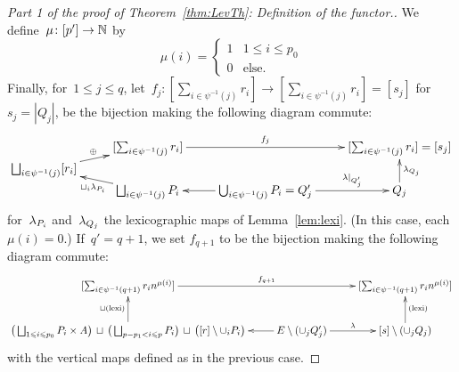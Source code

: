 \begin{proof}[Part 1 of the proof of Theorem~\ref{thm:LevTh}: Definition of the functor.]
We define~$\mu\colon[p']\to \mathbb{N}$ by 
$$\mu(i)=\left\{\begin{array}{ll} 1 & 1\le i\le p_0\\
0 & \textrm{else}. 
\end{array}\right.$$
Finally, for~$1\le j\le q$, let~$f_j\colon[\sum_{i\in \psi^{-1}(j)}r_i]\to [\sum_{i\in \psi^{-1}(j)}r_i]=[s_j]$ for $s_j=|Q_j|$, be the bijection making the following diagram commute: 
\begin{equation}\label{equ:Hmor}
\xymatrix@R-2pc{&[\sum_{i\in \psi^{-1}(j)}r_i]  \ar[rr]^-{f_j} && [\sum_{i\in \psi^{-1}(j)}r_i]=[s_j]\\
\bigsqcup_{i\in \psi^{-1}(j)}[r_i]\ar[ur]^-\oplus & &&  \\
&\bigsqcup_{i\in \psi^{-1}(j)}P_i  \ar[ul]^-{\sqcup_i\la_{P_i}} & \ar[l]\bigcup_{i\in \psi^{-1}(j)}P_i = Q'_j \ar[r]^-{\la|_{Q'_j}} & Q_j \ar[uu]_-{\la_{Q_j}} 
}\end{equation}
for~$\lambda_{P_i}$ and~$\lambda_{Q_j}$ the lexicographic maps of Lemma~\ref{lem:lexi}. (In this case, each $\mu(i)=0$.)  %
If~$q'=q+1$, we set $f_{q+1}$ 
to be the bijection making the following diagram commute: 
$$\xymatrix{[\sum_{i\in \psi^{-1}(q+1)}r_i n^{\mu(i)}]  \ar[rr]^-{f_{q+1}} && [\sum_{i\in \psi^{-1}(q+1)}r_i n^{\mu(i)}]\\
\big(\bigsqcup_{1\le i\le p_0}P_i\x A \big)\,\sqcup\,\big(\bigsqcup_{p-p_1< i\le p}P_i\big)\,  \sqcup \,\big([r]\minus \cup_i P_i\big) \ar[u]^{\sqcup(\textrm{lexi})}%
& \ar[l] E\minus (\cup_jQ'_j) \ar[r]^-{\la} & [s]\minus(\cup_jQ_j) \ar[u]_{(\textrm{lexi})}%
}$$
with the vertical maps defined as in the previous case. 




\end{proof}
